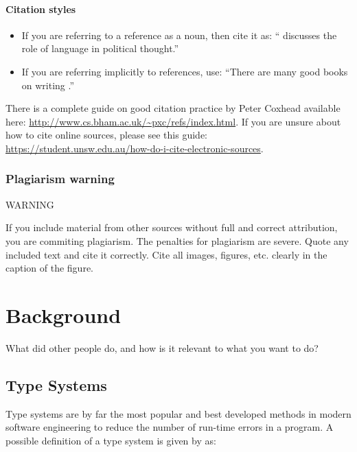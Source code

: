 \documentclass{l4proj}
\begin{document}
\subsubsection{Citation styles}

\begin{itemize}
    \item If you are referring to a reference as a noun, then cite it as: ``\citet{Orw68} discusses
          the role of language in political thought.''
    \item If you are referring implicitly to references, use: ``There are many good books on writing
          \citep{Orw68, Wil09, Pin15}.''
\end{itemize}

There is a complete guide on good citation practice by Peter Coxhead available here: 
\url{http://www.cs.bham.ac.uk/~pxc/refs/index.html}. 
If you are unsure about how to cite online sources, please see this guide: 
\url{https://student.unsw.edu.au/how-do-i-cite-electronic-sources}.

\subsection{Plagiarism warning}

\begin{highlight_title}{WARNING}
    
    If you include material from other sources without full and correct attribution, you are 
    commiting plagiarism. The penalties for plagiarism are severe. Quote any included text and cite
    it correctly. Cite all images, figures, etc. clearly in the caption of the figure.
\end{highlight_title}


\chapter{Background}
What did other people do, and how is it relevant to what you want to do?

\section{Type Systems}

Type systems are by far the most popular and best developed methods in modern software engineering 
to reduce the number of run-time errors in a program. A possible definition of a type system is 
given by \citet{Pierce2002} as:
\end{document}
